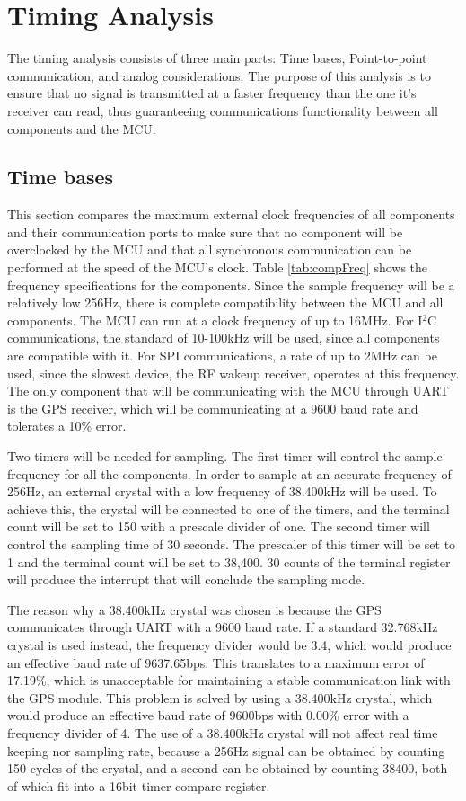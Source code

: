 \section{Timing Analysis}
The timing analysis consists of three main parts: Time bases, Point-to-point communication, and analog considerations. The purpose of this analysis is to ensure that no signal is transmitted at a faster frequency than the one it's receiver can read, thus guaranteeing communications functionality between all components and the MCU.

\subsection{Time bases}
This section compares the maximum external clock frequencies of all components and their communication ports to make sure that no component will be overclocked by the MCU and that all synchronous communication can be performed at the speed of the MCU's clock. Table \ref{tab:compFreq} shows the frequency specifications for the components.  Since the sample frequency will be a relatively low 256Hz, there is complete compatibility between the MCU and all components. The MCU can run at a clock frequency of up to 16MHz. For I$^2$C communications, the standard of 10-100kHz will be used, since all components are compatible with it. For SPI communications, a rate of up to 2MHz can be used, since the slowest device, the RF wakeup receiver, operates at this frequency. The only component that will be communicating with the MCU through UART is the GPS receiver, which will be communicating at a 9600 baud rate and tolerates a 10\% error.

Two timers will be needed for sampling. The first timer will control the sample frequency for all the components.  In order to sample at an accurate frequency of 256Hz, an external crystal with a low frequency of 38.400kHz will be used. To achieve this, the crystal will be connected to one of the timers, and the terminal count will be set to 150 with a prescale divider of one. The second timer will control the sampling time of 30 seconds. The prescaler of this timer will be set to 1 and the terminal count will be set to 38,400. 30 counts of the terminal register will produce the interrupt that will conclude the sampling mode.

The reason why a 38.400kHz crystal was chosen is because the GPS communicates through UART with a 9600 baud rate. If a standard 32.768kHz crystal is used instead, the frequency divider would be 3.4, which would produce an effective baud rate of 9637.65bps. This translates to a maximum error of 17.19\%, which is unacceptable for maintaining a stable communication link with the GPS module. This problem is solved by using a 38.400kHz crystal, which would produce an effective baud rate of 9600bps with 0.00\% error with a frequency divider of 4. The use of a 38.400kHz crystal will not affect real time keeping nor sampling rate, because a 256Hz signal can be obtained by counting 150 cycles of the crystal, and a second can be obtained by counting 38400, both of which fit into a 16bit timer compare register.

